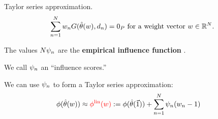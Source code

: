 \begin{frame}[t]{Taylor series approximation.}
\vspace{-2em}
\begin{align*}
%
\sumn \w_n
G(\thetahat(\w), \d_{n}) =  \zP
\textrm{ for a weight vector }\w \in \mathbb{R}^N.
%
\end{align*}
%
\begin{center}
\begin{minipage}{0.45\textwidth}
\LinearGraph{}
\end{minipage}
\end{center}

\pause
The values $N \psi_n$ are the \textbf{empirical influence function}
\citep{hampel1986robustbook}.

We call $\psi_n$ an ``influence scores.''

\pause
\vspace{1em}
We can use $\psi_n$ to form a Taylor series approximation:
%
\begin{align*}
	\phi(\hat{\theta}(w))
		&\approx
        \color{red}
        \phi^{\mathrm{lin}}(w)
        \color{black}
		:=  \phi(\hat{\theta}(\vec{1})) +
        \sum_{n=1}^N \psi_n (w_n -1)
        \color{black}
\end{align*}

\end{frame}






